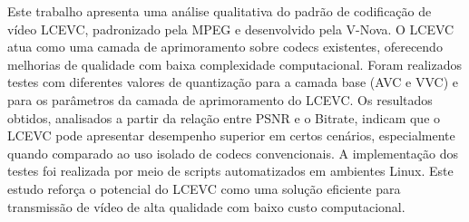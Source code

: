 Este trabalho apresenta uma análise qualitativa do padrão de codificação de vídeo \acrshort{LCEVC}, 
padronizado pela \acrshort{MPEG} e desenvolvido pela V-Nova. O \acrshort{LCEVC} atua como uma camada 
de aprimoramento sobre codecs existentes, oferecendo melhorias de qualidade com baixa complexidade 
computacional. Foram realizados testes com diferentes valores de quantização para a camada base 
(\acrshort{AVC} e \acrshort{VVC}) e para os parâmetros da camada de aprimoramento do \acrshort{LCEVC}. 
Os resultados obtidos, analisados a partir da relação entre \acrshort{PSNR} e o Bitrate, indicam que o 
\acrshort{LCEVC} pode apresentar desempenho superior em certos cenários, especialmente quando comparado 
ao uso isolado de codecs convencionais. A implementação dos testes foi realizada por meio de scripts
automatizados em ambientes Linux. Este estudo reforça o potencial do \acrshort{LCEVC} como uma solução 
eficiente para transmissão de vídeo de alta qualidade com baixo custo computacional.
